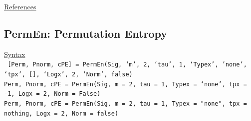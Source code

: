 \documentclass[12pt, a4paper, titlepage, openany]{book}
\begin{document}
\noindent \ul{References}\hspace{1cm}
\cite{K21} \cite{K22}



\newpage
\subsection{\normalsize PermEn: \hspace{15mm}  Permutation Entropy} \label{PermEn}
\noindent\ul{Syntax} \vspace{6mm} \\ \noindent \texttt{\footnotesize
[Perm, Pnorm, cPE] = PermEn(Sig, ‘m’, 2, ‘tau’, 1, ‘Typex’, ’none’, ‘tpx’, [], ‘Logx’, 2, ‘Norm’, false)\\
Perm, Pnorm, cPE  = PermEn(Sig, m = 2, tau = 1, Typex = ‘none’, tpx = -1, Logx = 2, Norm = False)\\ 
Perm, Pnorm, cPE  = PermEn(Sig, m = 2, tau = 1, Typex = "none", tpx = nothing, Logx = 2, Norm = false) }
\end{document}

